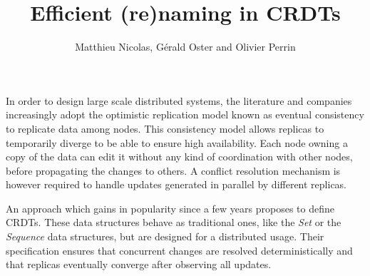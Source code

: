 \documentclass{article}
\title{Efficient (re)naming in \acp{CRDT}}
\author{Matthieu Nicolas, Gérald Oster and Olivier Perrin}
\begin{document}
\maketitle
\thispagestyle{empty}


In order to design large scale distributed systems, the literature and companies increasingly adopt the optimistic replication model known as eventual consistency to replicate data among nodes.
This consistency model allows replicas to temporarily diverge to be able to ensure high availability.
Each node owning a copy of the data can edit it without any kind of coordination with other nodes, before propagating the changes to others.
A conflict resolution mechanism is however required to handle updates generated in parallel by different replicas.


An approach which gains in popularity since a few years proposes to define \acfp{CRDT}.
These data structures behave as traditional ones, like the \emph{Set} or the \emph{Sequence} data structures, but are designed for a distributed usage.
Their specification ensures that concurrent changes are resolved deterministically and that replicas eventually converge after observing all updates.



\end{document}

